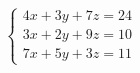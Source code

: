 \documentclass[preview]{standalone}
\begin{document}
\begin{align*}
\begin{cases} 4x + 3y + 7z = 24 \\ 3x + 2y + 9z = 10 \\ 7x + 5y + 3z = 11 \end{cases}
\end{align*}
\end{document}
